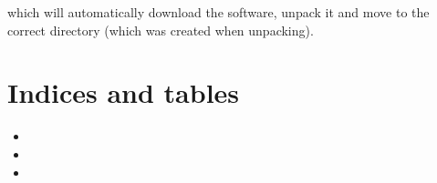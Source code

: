 \documentclass[letterpaper,10pt,openany,oneside]{sphinxmanual}
\begin{document}
which will automatically download the software, unpack it and move to the
correct directory (which was created when unpacking).


\chapter{Indices and tables}
\label{index:indices-and-tables}\begin{itemize}
\item {} 

\item {} 

\item {} 

\end{itemize}



\renewcommand{\indexname}{Index}
\printindex
\end{document}
